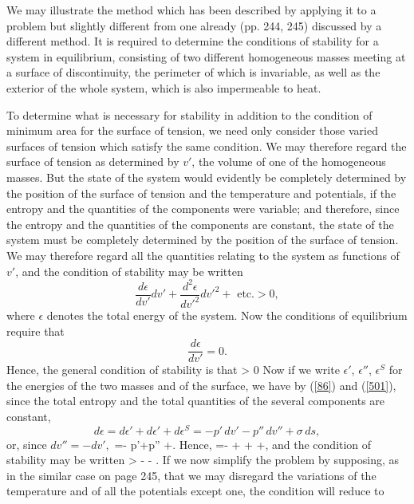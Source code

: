 \documentclass[12pt]{article}
\begin{document}
{We may illustrate the method which has been described by applying it to a problem but slightly different from one already (pp. 244, 245) discussed by a different method. It is required to determine the conditions of stability for a system in equilibrium, consisting of two different homogeneous masses meeting at a surface of discontinuity, the perimeter of which is invariable, as well as the exterior of the whole system, which is also impermeable to heat.

To determine what is necessary for stability in addition to the condition of minimum area for the surface of tension, we need only consider those varied surfaces of tension which satisfy the same condition. We may therefore regard the surface of tension as determined by $v'$, the volume of one of the homogeneous masses. But the state of the system would evidently be completely determined by the position of the surface of tension and the temperature and potentials, if the entropy and the quantities of the components were variable; and therefore, since the entropy and the quantities of the components are constant, the state of the system must be completely determined by the position of the surface of tension. We may therefore regard all the quantities relating to the system as functions of $v'$, and the condition of stability may be written
$$\frac{d\epsilon}{dv'}dv'+ \frac{d^2\epsilon}{dv'^2}dv'^2+ \text{ etc.} > 0, $$
where $\epsilon$ denotes the total energy of the system. Now the conditions of equilibrium require that
$$ \frac{d\epsilon}{dv'}=0.$$
Hence, the general condition of stability is that
\eqs {}> 0\label{541}\eqe
Now if we write $\epsilon'$, $\epsilon''$, $\epsilon^S$ for the energies of the two masses and of the surface, we have by (\ref{86}) and (\ref{501}), since the total entropy and the total quantities of the several components are constant,
$$ d\epsilon = d\epsilon' + d\epsilon' + d\epsilon^S = -p' \, dv' -p''\, dv'' + \sigma \, ds, $$
or, since $dv''= -dv',$
\eqs {}=- p'+p'' +\sigma {}. \label{542}\eqe
Hence,
\eqs {}=- + + +\sigma {},  \label{543}\eqe
and the condition of stability may be written
\eqs \sigma {}>  - - .  \label{544}\eqe
If we now simplify the problem by supposing, as in the similar case on page 245, that we may disregard the variations of the temperature and of all the potentials except one, the condition will reduce to    
}
\end{document}
